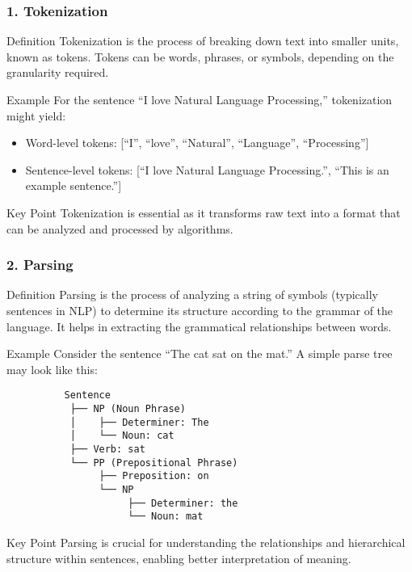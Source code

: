 \documentclass[aspectratio=169]{beamer}
\begin{document}
\begin{frame}[fragile]
    \frametitle{1. Tokenization}
    \begin{block}{Definition}
        Tokenization is the process of breaking down text into smaller units, known as tokens. Tokens can be words, phrases, or symbols, depending on the granularity required.
    \end{block}

    \begin{block}{Example}
        For the sentence “I love Natural Language Processing,” tokenization might yield:
        \begin{itemize}
            \item Word-level tokens: [“I”, “love”, “Natural”, “Language”, “Processing”]
            \item Sentence-level tokens: [“I love Natural Language Processing.”, “This is an example sentence.”]
        \end{itemize}
    \end{block}

    \begin{block}{Key Point}
        Tokenization is essential as it transforms raw text into a format that can be analyzed and processed by algorithms.
    \end{block}
\end{frame}

\begin{frame}[fragile]
    \frametitle{2. Parsing}
    \begin{block}{Definition}
        Parsing is the process of analyzing a string of symbols (typically sentences in NLP) to determine its structure according to the grammar of the language. It helps in extracting the grammatical relationships between words.
    \end{block}
    
    \begin{block}{Example}
        Consider the sentence “The cat sat on the mat.” A simple parse tree may look like this:
        \begin{lstlisting}
          Sentence
           ├── NP (Noun Phrase)
           │    ├── Determiner: The
           │    └── Noun: cat
           ├── Verb: sat
           └── PP (Prepositional Phrase)
                ├── Preposition: on
                └── NP
                     ├── Determiner: the
                     └── Noun: mat
        \end{lstlisting}
    \end{block}

    \begin{block}{Key Point}
        Parsing is crucial for understanding the relationships and hierarchical structure within sentences, enabling better interpretation of meaning.
    \end{block}
\end{frame}
\end{document}
